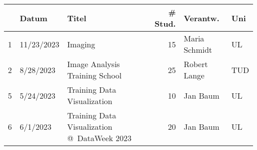 \begin{tabular}{lllrll}
\toprule
 & Datum & Titel & # Stud. & Verantw. & Uni \\
\midrule
1 & 11/23/2023 & Imaging & 15 & Maria Schmidt & UL \\
2 & 8/28/2023 & Image Analysis Training School & 25 & Robert Lange & TUD \\
5 & 5/24/2023 & Training Data Visualization & 10 & Jan Baum & UL \\
6 & 6/1/2023 & Training Data Visualization @ DataWeek 2023 & 20 & Jan Baum & UL \\
\bottomrule
\end{tabular}
